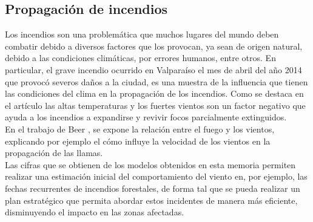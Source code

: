 \subsection{Propagación de incendios}
Los incendios son una problemática que muchos lugares del mundo deben combatir debido a diversos factores que los provocan, ya sean de origen natural, debido a las condiciones climáticas, por errores humanos, entre otros. En particular, el grave incendio ocurrido en Valparaíso el mes de abril del año 2014 \cite{incendioValpo} que provocó severos daños a la ciudad, es una muestra de la influencia que tienen las condiciones del clima en la propagación de los incendios. Como se destaca en el artículo \cite{incendioValpo} las altas temperaturas y los fuertes vientos son un factor negativo que ayuda a los incendios a expandirse y revivir focos parcialmente extinguidos.\\
En el trabajo de Beer \cite{Beer91}, se expone la relación entre el fuego y los vientos, explicando por ejemplo el cómo influye la velocidad de los vientos en la propagación de las llamas.\\
Las cifras que se obtienen de los modelos obtenidos en esta memoria permiten realizar una estimación inicial del comportamiento del viento en, por ejemplo, las fechas recurrentes de incendios forestales, de forma tal que se pueda realizar un plan estratégico que permita abordar estos incidentes de manera más eficiente, disminuyendo el impacto en las zonas afectadas.


